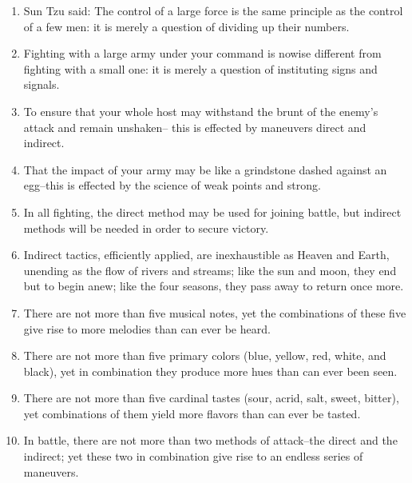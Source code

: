 \begin{enumerate}

  
\item Sun Tzu said:  The control of a large force
    is the same principle as the control of a few men: 
    it is merely a question of dividing up their numbers.

  \item Fighting with a large army under your command is nowise
    different from fighting with a small one: it is merely a question
    of instituting signs and signals.

  \item To ensure that your whole host may withstand the brunt of the
    enemy's attack and remain unshaken-- this is effected by maneuvers
    direct and indirect.

  \item That the impact of your army may be like a grindstone dashed
    against an egg--this is effected by the science of weak points and
    strong.

  \item In all fighting, the direct method may be used for joining
    battle, but indirect methods will be needed in order to secure
    victory.

  \item Indirect tactics, efficiently applied, are inexhaustible as
    Heaven and Earth, unending as the flow of rivers and streams; like
    the sun and moon, they end but to begin anew; like the four
    seasons, they pass away to return once more.

  \item There are not more than five musical notes, yet the
    combinations of these five give rise to more melodies than can
    ever be heard.

  \item There are not more than five primary colors (blue, yellow,
    red, white, and black), yet in combination they produce more hues
    than can ever been seen.

  \item There are not more than five cardinal tastes (sour, acrid,
    salt, sweet, bitter), yet combinations of them yield more flavors
    than can ever be tasted.

  \item In battle, there are not more than two methods of attack--the
    direct and the indirect; yet these two in combination give rise to
    an endless series of maneuvers.


\end{enumerate}
